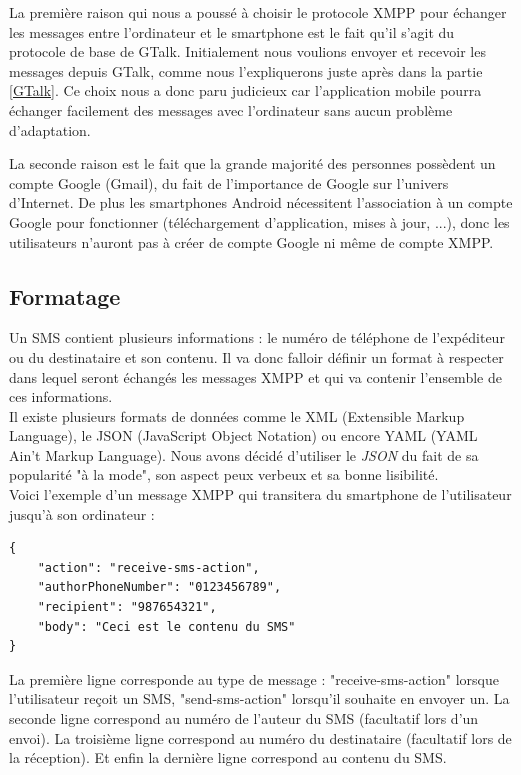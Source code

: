 La première raison qui nous a poussé à choisir le protocole XMPP pour échanger les messages entre l'ordinateur et le smartphone est le fait qu'il s'agit du protocole de base de GTalk.
Initialement nous voulions envoyer et recevoir les messages depuis GTalk, comme nous l'expliquerons juste après dans la partie \ref{GTalk}.
Ce choix nous a donc paru judicieux car l'application mobile pourra échanger facilement des messages avec l'ordinateur sans aucun problème d'adaptation.

La seconde raison est le fait que la grande majorité des personnes possèdent un compte Google (Gmail), du fait de l'importance de Google sur l'univers d'Internet.
De plus les smartphones Android nécessitent l'association à un compte Google pour fonctionner (téléchargement d'application, mises à jour, ...), donc les utilisateurs n'auront pas à créer de compte Google ni même de compte XMPP.




\subsection{Formatage}

Un SMS contient plusieurs informations : le numéro de téléphone de l'expéditeur ou du destinataire et son contenu.
Il va donc falloir définir un format à respecter dans lequel seront échangés les messages XMPP et qui va contenir l'ensemble de ces informations.
\\


Il existe plusieurs formats de données comme le XML (Extensible Markup Language), le JSON (JavaScript Object Notation) ou encore YAML (YAML Ain't Markup Language).
Nous avons décidé d'utiliser le \textit{JSON} du fait de sa popularité "à la mode", son aspect peux verbeux et sa bonne lisibilité.
\\


Voici l'exemple d'un message XMPP qui transitera du smartphone de l'utilisateur jusqu'à son ordinateur :
\begin{lstlisting}
{
    "action": "receive-sms-action",
    "authorPhoneNumber": "0123456789",
    "recipient": "987654321",
    "body": "Ceci est le contenu du SMS"
}
\end{lstlisting}
La première ligne corresponde au type de message : "receive-sms-action" lorsque l'utilisateur reçoit un SMS, "send-sms-action" lorsqu'il souhaite en envoyer un.
La seconde ligne correspond au numéro de l'auteur du SMS (facultatif lors d'un envoi).
La troisième ligne correspond au numéro du destinataire (facultatif lors de la réception).
Et enfin la dernière ligne correspond au contenu du SMS.



